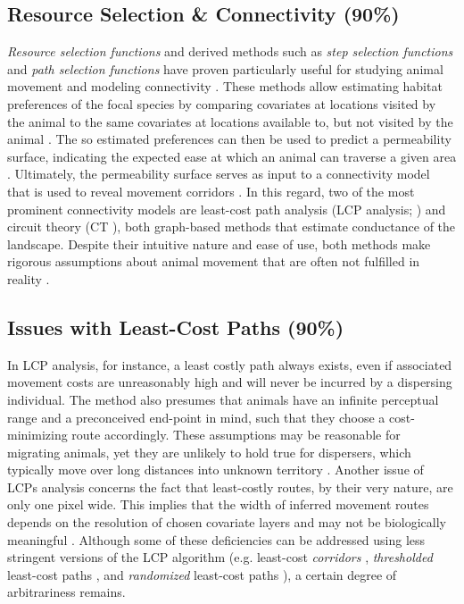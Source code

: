 \documentclass[abstract=on,10pt,a4paper,bibliography=totocnumbered]{article}
\begin{document}
\subsection{Resource Selection \& Connectivity (90\%)}
\textit{Resource selection functions} \citep{Boyce.2002} and derived methods
such as \textit{step selection functions} \citep{Fortin.2005} and \textit{path
selection functions} \citep{Cushman.2010} have proven particularly useful for
studying animal movement \citep{Fieberg.2020} and modeling connectivity
\citep{Diniz.2020}. These methods allow estimating habitat preferences of the
focal species by comparing covariates at locations visited by the animal to the
same covariates at locations available to, but not visited by the animal
\citep{Boyce.2002, Fortin.2005, Cushman.2010, Thurfjell.2014}. The so estimated
preferences can then be used to predict a permeability surface, indicating the
expected ease at which an animal can traverse a given area \citep{Spear.2010,
Zeller.2012, Etherington.2016}. Ultimately, the permeability surface serves as
input to a connectivity model that is used to reveal movement corridors
\citep{Diniz.2020}. In this regard, two of the most prominent connectivity
models are least-cost path analysis (LCP analysis; \citealp{Adriaensen.2003})
and circuit theory (CT \citealp{McRae.2006, McRae.2008}), both graph-based
methods that estimate conductance of the landscape. Despite their intuitive
nature and ease of use, both methods make rigorous assumptions about animal
movement that are often not fulfilled in reality \citep{Diniz.2020}.

\subsection{Issues with Least-Cost Paths (90\%)}
In LCP analysis, for instance, a least costly path always exists, even if
associated movement costs are unreasonably high and will never be incurred by a
dispersing individual. The method also presumes that animals have an infinite
perceptual range and a preconceived end-point in mind, such that they choose a
cost-minimizing route accordingly. These assumptions may be reasonable for
migrating animals, yet they are unlikely to hold true for dispersers, which
typically move over long distances into unknown territory \citep{Koen.2014,
Abrahms.2017, Cozzi.2020}. Another issue of LCPs analysis concerns the fact that
least-costly routes, by their very nature, are only one pixel wide. This implies
that the width of inferred movement routes depends on the resolution of chosen
covariate layers and may not be biologically meaningful \citep{Diniz.2020}.
Although some of these deficiencies can be addressed using less stringent
versions of the LCP algorithm (e.g. least-cost \textit{corridors}
\citep{Pinto.2009}, \textit{thresholded} least-cost paths \citep{Landguth.2012},
and \textit{randomized} least-cost paths \citep{Panzacchi.2016,
VanMoorter.2021}), a certain degree of arbitrariness remains.
\end{document}
